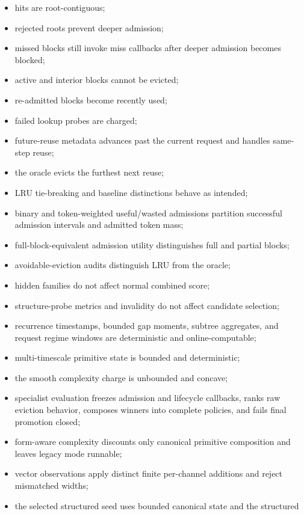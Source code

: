 \documentclass[11pt]{article}
\begin{document}
\begin{itemize}
  \item hits are root-contiguous;
  \item rejected roots prevent deeper admission;
  \item missed blocks still invoke miss callbacks after deeper admission becomes
  blocked;
  \item active and interior blocks cannot be evicted;
  \item re-admitted blocks become recently used;
  \item failed lookup probes are charged;
  \item future-reuse metadata advances past the current request and handles same-step
  reuse;
  \item the oracle evicts the furthest next reuse;
  \item LRU tie-breaking and baseline distinctions behave as intended;
  \item binary and token-weighted useful/wasted admissions partition successful
  admission intervals and admitted token mass;
  \item full-block-equivalent admission utility distinguishes full and partial blocks;
  \item avoidable-eviction audits distinguish LRU from the oracle;
  \item hidden families do not affect normal combined score;
  \item structure-probe metrics and invalidity do not affect candidate selection;
  \item recurrence timestamps, bounded gap moments, subtree aggregates, and request
  regime windows are deterministic and online-computable;
  \item multi-timescale primitive state is bounded and deterministic;
  \item the smooth complexity charge is unbounded and concave;
  \item specialist evaluation freezes admission and lifecycle callbacks, ranks raw
  eviction behavior, composes winners into complete policies, and fails final
  promotion closed;
  \item form-aware complexity discounts only canonical primitive composition and leaves
  legacy mode runnable;
  \item vector observations apply distinct finite per-channel additions and reject
  mismatched widths;
  \item the selected structured seed uses bounded canonical state and the structured

\end{itemize}
\end{document}
